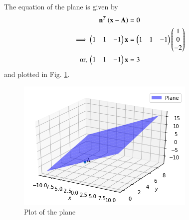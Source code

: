 The equation of the plane is given by 
\begin{align}
\mathbf{n}^T\left(\mathbf{x}-\mathbf{A}\right) &= 0
\\
\implies \begin{pmatrix}1 & 1 & -1\end{pmatrix}{\mathbf{x}} &= \begin{pmatrix}1 & 1 & -1\end{pmatrix}{\ensuremath{\begin{pmatrix}1\\0\\-2\end{pmatrix}}}
\\
\text{or, }\begin{pmatrix}1 & 1 & -1\end{pmatrix}{\mathbf{x}} &= 3
\end{align}
and plotted in Fig. \ref{linform/35/1/Plot of the plane}.

\begin{figure}[ht]
\centering
\includegraphics[width=\columnwidth]{solutions/su2021/2/35/1/Plane_plot1.PNG}
\caption{Plot of the plane}
\label{linform/35/1/Plot of the plane}
\end{figure}


